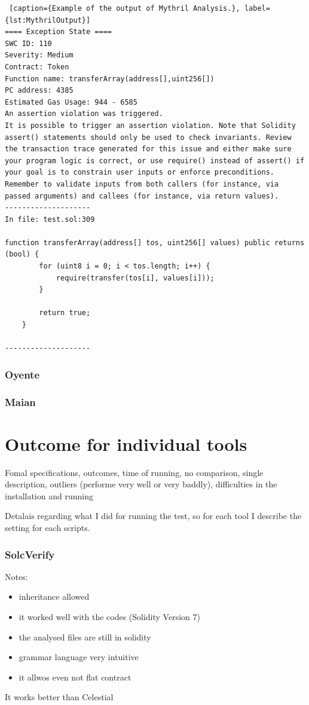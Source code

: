 \begin{lstlisting} [caption={Example of the output of Mythril Analysis.}, label={lst:MythrilOutput}]
==== Exception State ====
SWC ID: 110
Severity: Medium
Contract: Token
Function name: transferArray(address[],uint256[])
PC address: 4385
Estimated Gas Usage: 944 - 6585
An assertion violation was triggered.
It is possible to trigger an assertion violation. Note that Solidity assert() statements should only be used to check invariants. Review the transaction trace generated for this issue and either make sure your program logic is correct, or use require() instead of assert() if your goal is to constrain user inputs or enforce preconditions. Remember to validate inputs from both callers (for instance, via passed arguments) and callees (for instance, via return values).
--------------------
In file: test.sol:309

function transferArray(address[] tos, uint256[] values) public returns (bool) {
        for (uint8 i = 0; i < tos.length; i++) {
            require(transfer(tos[i], values[i]));
        }

        return true;
    }

--------------------

\end{lstlisting}

\subsection{Oyente}
\label{sec:WithoutSpecification:Oyente}

\subsection{Maian}
\label{sec:WithoutSpecification:Maian}

\chapter{Outcome for individual tools}
\label{ch:Running}
Fomal specifications, outcomes, time of running, no comparison, single description, outliers (performe very well or very baddly), 
difficulties in the installation and running 


Detalais regarding what I did for running the test, so for each tool I describe the setting for each scripts.


\subsection{SolcVerify}
Notes:
\begin{itemize}
    \item inheritance allowed 
    \item it worked well with the codes (Solidity Version 7)
    \item the analysed files are still in solidity 
    \item grammar language very intuitive 
    \item it allwos even not flat contract 
\end{itemize}
It works better than Celestial 

